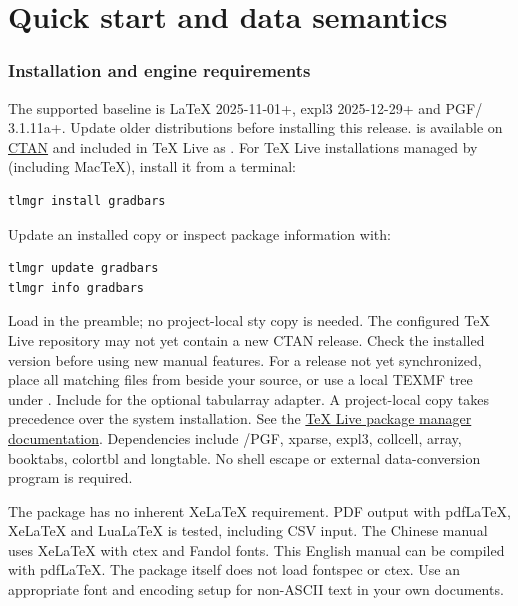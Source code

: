 \part{Quick start and data semantics}

\section{Installation and engine requirements}
The supported baseline is LaTeX 2025-11-01+, expl3 2025-12-29+ and
PGF/\manualTikZ{} 3.1.11a+. Update older distributions before installing this release.
 is available on \href{https://ctan.org/pkg/gradbars}{CTAN} and included
in TeX Live as . For TeX Live installations managed by  (including
MacTeX), install it from a terminal:
\begin{lstlisting}[style=gradmanual,language={}]
tlmgr install gradbars
\end{lstlisting}
Update an installed copy or inspect package information with:
\begin{lstlisting}[style=gradmanual,language={}]
tlmgr update gradbars
tlmgr info gradbars
\end{lstlisting}
Load \key{\usepackage{gradbars}} in the preamble; no project-local sty copy is
needed. The configured TeX Live repository may not yet contain a new CTAN
release. Check the installed version before using new manual features.
For a release not yet synchronized, place all matching  files
from  beside your source, or use a local TEXMF tree under .
Include  for the optional tabularray adapter.
A project-local copy takes precedence over the system installation. See the
\href{https://tug.org/texlive/doc/tlmgr.html}{TeX Live package manager documentation}.
Dependencies include \manualTikZ{}/PGF, xparse, expl3, collcell, array, booktabs, colortbl and longtable.
No shell escape or external data-conversion program is required.

The package has no inherent XeLaTeX requirement. PDF output with pdfLaTeX,
XeLaTeX and LuaLaTeX is tested, including CSV input. The Chinese manual uses XeLaTeX with
ctex and Fandol fonts. This English manual can be compiled with pdfLaTeX.
The package itself does not load fontspec or ctex. Use an appropriate font and
encoding setup for non-ASCII text in your own documents.


